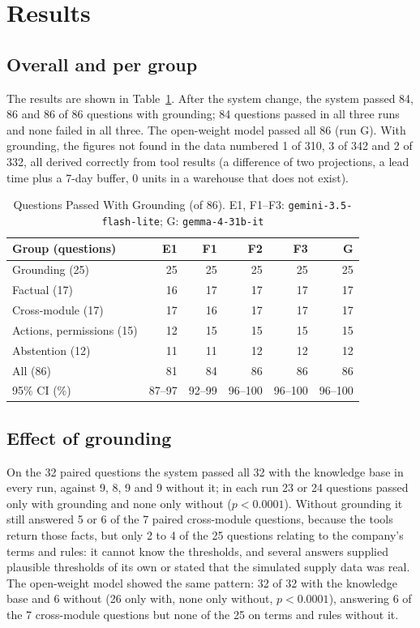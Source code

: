 \documentclass[conference]{IEEEtran}
\begin{document}
\section{Results}

\subsection{Overall and per group}

The results are shown in Table~\ref{tab:overall}. After the system change, the system passed 84, 86 and 86
of 86 questions with grounding; 84 questions passed in all three runs and none failed in all three. The
open-weight model passed all 86 (run G). With grounding,
the figures not found in the data numbered 1 of 310, 3 of 342 and 2 of 332, all derived correctly from tool
results (a difference of two projections, a lead time plus a 7-day buffer, 0 units in a warehouse that does
not exist).

\begin{table}[t]
\caption{Questions Passed With Grounding (of 86). E1, F1--F3: \texttt{gemini-3.5-flash-lite}; G: \texttt{gemma-4-31b-it}}
\label{tab:overall}
\centering
\footnotesize
\setlength{\tabcolsep}{3.5pt}
\begin{tabular}{@{}lrrrrr@{}}
\toprule
Group (questions) & E1 & F1 & F2 & F3 & G \\
\midrule
Grounding (25) & 25 & 25 & 25 & 25 & 25 \\
Factual (17) & 16 & 17 & 17 & 17 & 17 \\
Cross-module (17) & 17 & 16 & 17 & 17 & 17 \\
Actions, permissions (15) & 12 & 15 & 15 & 15 & 15 \\
Abstention (12) & 11 & 11 & 12 & 12 & 12 \\
\midrule
All (86) & 81 & 84 & 86 & 86 & 86 \\
95\% CI (\%) & 87--97 & 92--99 & 96--100 & 96--100 & 96--100 \\
\bottomrule
\end{tabular}
\end{table}

\subsection{Effect of grounding}

On the 32 paired questions the system passed all 32 with the knowledge base in every run, against 9, 8, 9
and 9 without it; in each run 23 or 24 questions passed only with grounding and none only without
($p<0.0001$). Without grounding it still answered 5 or 6 of the 7 paired cross-module questions, because the
tools return those facts, but only 2 to 4 of the 25 questions relating to the company's terms and rules: it cannot
know the thresholds, and several answers supplied plausible thresholds of its own or stated that the
simulated supply data was real. The open-weight model showed the same pattern: 32 of 32 with the knowledge
base and 6 without (26 only with, none only without, $p<0.0001$), answering 6 of the 7 cross-module questions
but none of the 25 on terms and rules without it.
\end{document}
